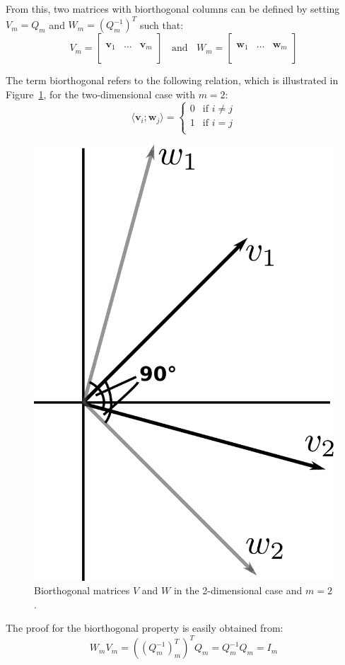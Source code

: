 \noindent From this, two matrices with biorthogonal columns can be defined by setting $V_m=Q_m$ and $W_m=(Q_m^{-1})^T$ such that:
\begin{equation}
  V_m =
  \left[
    \begin{array}{c|c|c}
      & &  \\
      \bm{v}_1 & \dots & \bm{v}_m \\
      & &  \\
    \end{array}
  \right] \;\; \text{ and }\;\;
    W_m =
  \left[
    \begin{array}{c|c|c}
      & &  \\
      \bm{w}_1 & \dots & \bm{w}_m \\
      & &  \\
    \end{array}
  \right]
\end{equation}

\noindent The term biorthogonal refers to the following relation, which is illustrated in Figure~\hyperref[fig:biorthogonal]{\ref{fig:biorthogonal}}, for the two-dimensional case with $m=2$:
\begin{equation}
    \langle \bm{v}_i;\bm{w}_j\rangle =\begin{cases}
      0 & \text{if }i \neq j\\
      1 & \text{if }i = j\\
    \end{cases}  
\end{equation}

\begin{figure}[h]
    \centering
    \includegraphics[width=0.3\linewidth]{figures/biorthogonal.pdf}
    \caption{Biorthogonal matrices $V$ and $W$ in the 2-dimensional case and $m=2$.}
    \label{fig:biorthogonal}
\end{figure}

\noindent The proof for the biorthogonal property is easily obtained from:
\begin{equation}
    W_mV_m=((Q_m^{-1})^T_m)^TQ_m = Q_m^{-1}Q_m = I_m
\end{equation}

